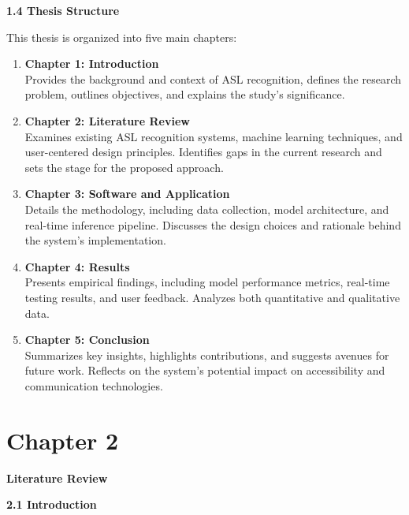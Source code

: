 \documentclass[12pt]{article}
\begin{document}
\vspace{1.5em}
\noindent
\textbf{1.4 Thesis Structure}
\noindent
This thesis is organized into five main chapters:

\begin{enumerate}
  \item \textbf{Chapter 1: Introduction}\\
  Provides the background and context of ASL recognition, defines the research problem, outlines objectives, and explains the study’s significance.
  \item \textbf{Chapter 2: Literature Review}\\
  Examines existing ASL recognition systems, machine learning techniques, and user-centered design principles. Identifies gaps in the current research and sets the stage for the proposed approach.
  \item \textbf{Chapter 3: Software and Application}\\
  Details the methodology, including data collection, model architecture, and real-time inference pipeline. Discusses the design choices and rationale behind the system’s implementation.
  \item \textbf{Chapter 4: Results}\\
  Presents empirical findings, including model performance metrics, real-time testing results, and user feedback. Analyzes both quantitative and qualitative data.
  \item \textbf{Chapter 5: Conclusion}\\
  Summarizes key insights, highlights contributions, and suggests avenues for future work. Reflects on the system’s potential impact on accessibility and communication technologies.
\end{enumerate}

\newpage
\section*{Chapter 2}
\begin{center}
    \large \textbf{Literature Review}
\end{center}

\vspace{1.5em}
\noindent
\textbf{2.1 Introduction}
\vspace{1em}
\end{document}
